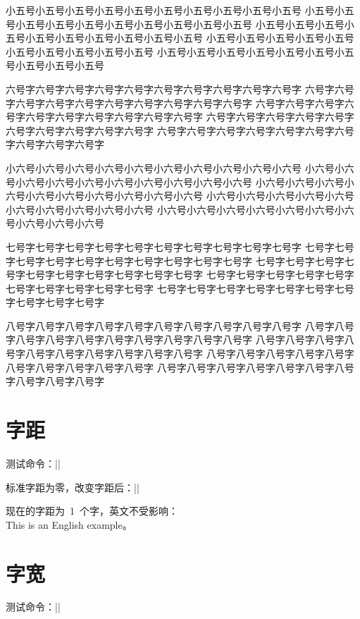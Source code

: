 \documentclass[cs4size,a4paper,fancyhdr,fntef,UTF8]{ctexbook}
\begin{document}
小五号小五号小五号小五号小五号小五号小五号小五号小五号小五号
小五号小五号小五号小五号小五号小五号小五号小五号小五号小五号
小五号小五号小五号小五号小五号小五号小五号小五号小五号小五号
小五号小五号小五号小五号小五号小五号小五号小五号小五号小五号
小五号小五号小五号小五号小五号小五号小五号小五号小五号小五号

六号字六号字六号字六号字六号字六号字六号字六号字六号字六号字
六号字六号字六号字六号字六号字六号字六号字六号字六号字六号字
六号字六号字六号字六号字六号字六号字六号字六号字六号字六号字
六号字六号字六号字六号字六号字六号字六号字六号字六号字六号字
六号字六号字六号字六号字六号字六号字六号字六号字六号字六号字

小六号小六号小六号小六号小六号小六号小六号小六号小六号小六号
小六号小六号小六号小六号小六号小六号小六号小六号小六号小六号
小六号小六号小六号小六号小六号小六号小六号小六号小六号小六号
小六号小六号小六号小六号小六号小六号小六号小六号小六号小六号
小六号小六号小六号小六号小六号小六号小六号小六号小六号小六号

七号字七号字七号字七号字七号字七号字七号字七号字七号字七号字
七号字七号字七号字七号字七号字七号字七号字七号字七号字七号字
七号字七号字七号字七号字七号字七号字七号字七号字七号字七号字
七号字七号字七号字七号字七号字七号字七号字七号字七号字七号字
七号字七号字七号字七号字七号字七号字七号字七号字七号字七号字

八号字八号字八号字八号字八号字八号字八号字八号字八号字八号字
八号字八号字八号字八号字八号字八号字八号字八号字八号字八号字
八号字八号字八号字八号字八号字八号字八号字八号字八号字八号字
八号字八号字八号字八号字八号字八号字八号字八号字八号字八号字
八号字八号字八号字八号字八号字八号字八号字八号字八号字八号字

\normalsize

\section{字距}

测试命令：|\ziju| 

标准字距为零，改变字距后：||

{
现在的字距为~1~个字，英文不受影响：\\
This is an English example。
}

\section{字宽}

测试命令：|\ccwd| 
\end{document}
